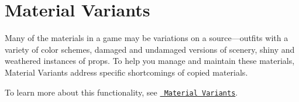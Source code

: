 \chapter{Material Variants}
\hypertarget{md__hey_tea_9_2_library_2_package_cache_2com_8unity_8render-pipelines_8universal_0d14_80_88_2_do623609da675dcccca082df0ba4b5fa19}{}\label{md__hey_tea_9_2_library_2_package_cache_2com_8unity_8render-pipelines_8universal_0d14_80_88_2_do623609da675dcccca082df0ba4b5fa19}
\label{md__hey_tea_9_2_library_2_package_cache_2com_8unity_8render-pipelines_8universal_0d14_80_88_2_do623609da675dcccca082df0ba4b5fa19_autotoc_md2237}%
%
 Many of the materials in a game may be variations on a source---outfits with a variety of color schemes, damaged and undamaged versions of scenery, shiny and weathered instances of props. To help you manage and maintain these materials, Material Variants address specific shortcomings of copied materials.

To learn more about this functionality, see \href{https://docs.unity3d.com/2023.1/Documentation/Manual/materialvariant-landingpage.html}{\texttt{ Material Variants}}. 